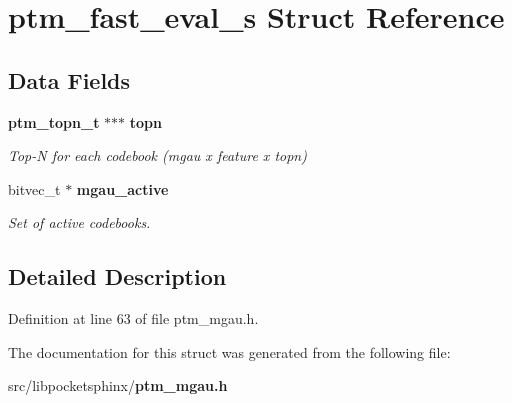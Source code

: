 \section{ptm\+\_\+fast\+\_\+eval\+\_\+s Struct Reference}
\label{structptm__fast__eval__s}
\subsection*{Data Fields}
\begin{DoxyCompactItemize}
\item 
{\bf ptm\+\_\+topn\+\_\+t} $\ast$$\ast$$\ast$ {\bf topn}\label{structptm__fast__eval__s_a95e382028ed8a0af8b56bfcb797af96b}

\begin{DoxyCompactList}\small\item\em Top-\/\+N for each codebook (mgau x feature x topn) \end{DoxyCompactList}\item 
bitvec\+\_\+t $\ast$ {\bf mgau\+\_\+active}\label{structptm__fast__eval__s_ac5d3b21239d567b395015d7c4fea157c}

\begin{DoxyCompactList}\small\item\em Set of active codebooks. \end{DoxyCompactList}\end{DoxyCompactItemize}


\subsection{Detailed Description}


Definition at line 63 of file ptm\+\_\+mgau.\+h.



The documentation for this struct was generated from the following file\+:\begin{DoxyCompactItemize}
\item 
src/libpocketsphinx/{\bf ptm\+\_\+mgau.\+h}\end{DoxyCompactItemize}
